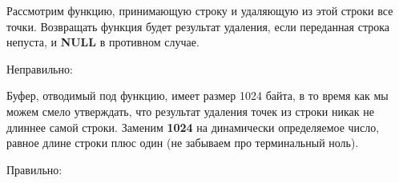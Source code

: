 \begin{typerror}
	\label{TE_not-using-dynarray-size}

	Рассмотрим функцию, принимающую строку и удаляющую из этой строки все точки.
	Возвращать функция будет результат удаления, если переданная строка непуста, и \textbf{NULL} в противном случае.

	Неправильно:

	Буфер, отводимый под функцию, имеет размер 1024 байта,
	в то время как мы можем смело утверждать, что результат удаления точек из строки никак не длиннее самой строки.
	Заменим \textbf{1024} на динамически определяемое число, равное длине строки плюс один
	(не забываем про терминальный ноль).

	Правильно:

\end{typerror}
